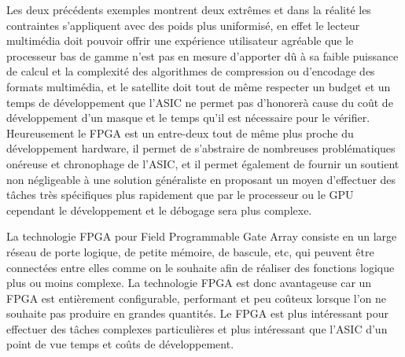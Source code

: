 \documentclass[a4paper,12pt]{article}
\begin{document}
Les deux précédents exemples montrent deux extrêmes et dans la réalité les contraintes s'appliquent avec des poids plus uniformisé, en effet le lecteur multimédia doit pouvoir offrir une expérience utilisateur agréable que le processeur bas de gamme n'est pas en mesure d'apporter dû à sa faible puissance de calcul et la complexité des algorithmes de compression ou d'encodage des formats multimédia, et le satellite doit tout de même respecter un budget et un temps de développement que l'ASIC ne permet pas d'honorer\footnotemark[3] à cause du coût de développement d'un masque et le temps qu'il est nécessaire pour le vérifier. Heureusement le FPGA est un entre-deux tout de même plus proche du développement hardware, il permet de s'abstraire de nombreuses problématiques onéreuse et chronophage de l'ASIC, et il permet également de fournir un soutient non négligeable à une solution généraliste en proposant un moyen d'effectuer des tâches très spécifiques plus rapidement que par le processeur ou le GPU cependant le développement et le débogage sera plus complexe.\newline

La technologie FPGA pour Field Programmable Gate Array consiste en un large réseau de porte logique, de petite mémoire, de bascule, etc, qui peuvent être connectées entre elles comme on le souhaite afin de réaliser des fonctions logique plus ou moins complexe. La technologie FPGA est donc avantageuse car un FPGA est entièrement configurable, performant et peu coûteux lorsque l'on ne souhaite pas produire en grandes quantités. Le FPGA est plus intéressant pour effectuer des tâches complexes particulières et plus intéressant que l'ASIC d'un point de vue temps et coûts de développement.\newline 
\end{document}
